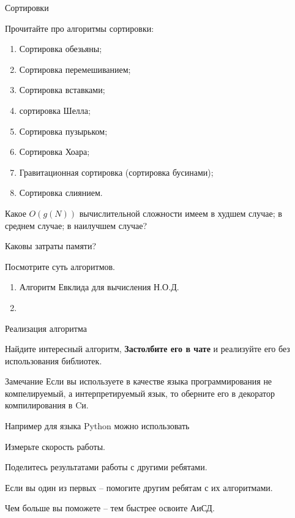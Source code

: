 \begin{frame}{Сортировки}
	
	Прочитайте про алгоритмы сортировки:
	\begin{enumerate}
		\item Сортировка обезьяны;
		\item Сортировка перемешиванием;
		\item Сортировка вставками;
		\item сортировка Шелла;
		\item Сортировка пузырьком;
		\item Сортировка Хоара;
		\item Гравитационная сортировка (сортировка бусинами);
		\item Сортировка слиянием.
	\end{enumerate}
	
	Какое $O(g(N))$ вычислительной сложности
	имеем 
	в худшем случае; 
	в среднем случае; 
	в наилучшем случае?
	
	Каковы затраты памяти?
	
	
\end{frame}


\begin{frame}
	Посмотрите суть алгоритмов.
	
	\begin{enumerate}
		\item Алгоритм Евклида для вычисления Н.О.Д.
		\item %
	\end{enumerate}
\end{frame}


\begin{frame}{Реализация алгоритма}
	
	Найдите интересный алгоритм, 	\textbf{Застолбите его в чате} и реализуйте его без использования библиотек.
	

	
	\begin{block}{Замечание}
		Если вы используете в качестве языка программирования не компелируемый, а интерпретируемый язык,
		то оберните его в декоратор компилирования в Cи.
		
		Например для языка Python можно использовать 
	\end{block}
	
	Измерьте скорость работы.
	
	Поделитесь результатами работы с другими ребятами.
	
	Если вы один из первых -- помогите другим ребятам с их алгоритмами.
	
	Чем больше вы поможете -- тем быстрее освоите АиСД.
	
	
\end{frame}


